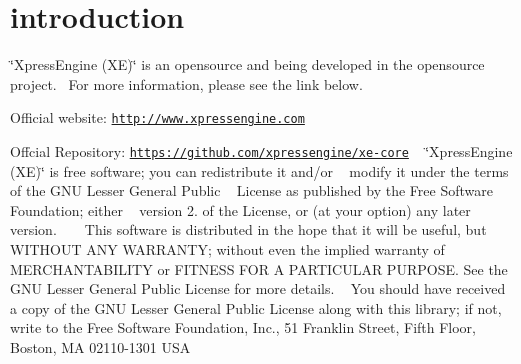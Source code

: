 \hypertarget{index_intro}{}\section{introduction}\label{index_intro}
\char`\"{}\+Xpress\+Engine (\+X\+E)\char`\"{} is an opensource and being developed in the opensource project.~\newline
For more information, please see the link below.
\begin{DoxyItemize}
\item Official website\+: \href{http://www.xpressengine.com}{\tt http\+://www.\+xpressengine.\+com}
\item Offcial Repository\+: \href{https://github.com/xpressengine/xe-core}{\tt https\+://github.\+com/xpressengine/xe-\/core} ~\newline
\char`\"{}\+Xpress\+Engine (\+X\+E)\char`\"{} is free software; you can redistribute it and/or ~\newline
modify it under the terms of the G\+N\+U Lesser General Public ~\newline
License as published by the Free Software Foundation; either ~\newline
version 2. of the License, or (at your option) any later version. ~\newline
~\newline
This software is distributed in the hope that it will be useful, but W\+I\+T\+H\+O\+U\+T A\+N\+Y W\+A\+R\+R\+A\+N\+T\+Y; without even the implied warranty of M\+E\+R\+C\+H\+A\+N\+T\+A\+B\+I\+L\+I\+T\+Y or F\+I\+T\+N\+E\+S\+S F\+O\+R A P\+A\+R\+T\+I\+C\+U\+L\+A\+R P\+U\+R\+P\+O\+S\+E. See the G\+N\+U Lesser General Public License for more details. ~\newline
You should have received a copy of the G\+N\+U Lesser General Public License along with this library; if not, write to the Free Software Foundation, Inc., 51 Franklin Street, Fifth Floor, Boston, M\+A 02110-\/1301 U\+S\+A 
\end{DoxyItemize}